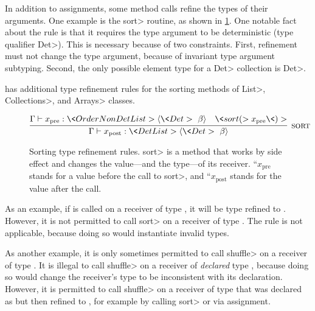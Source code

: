 In addition to assignments, some method calls refine the types of their
arguments.  One example is the \<sort> routine,
as shown in \cref{fig-sorting}.  One notable fact about the 
rule is that it requires the type argument to be deterministic (type
qualifier \<Det>).  This is necessary because of two constraints.
First, refinement must not change the type argument, because of invariant
type argument subtyping.
Second, the only possible element type for a \<Det> collection is \<Det>.


\TheDeterminismChecker has additional type refinement rules for the sorting
methods of \<List>, \<Collections>, and \<Arrays> classes.
\begin{figure}
%     
    
  $\infer[\rulename{sort}]
  {\Gamma \vdash x_{\mathrm{post}} : \<Det List>\angles{\<Det>\ \beta}}
  {\Gamma \vdash x_{\mathrm{pre}} : \<OrderNonDet List>\angles{\<Det>\ \beta} & \<sort(>x_{\mathrm{pre}}\<)>}$
    
%     
    
    \caption{Sorting type refinement rules.  \<sort> is a method that works
      by side effect and changes the value---and the type---of its receiver.
    ``$x_{\mathrm{pre}}$ stands for a value before the call to \<sort>, and
      ``$x_{\mathrm{post}}$ stands for the value after the call.
    }
    \label{fig-sorting}
\end{figure}
As an example, if  is called on a receiver of type
, it will be type refined to
. However, it is not permitted to
call \<sort> on a receiver of type .  The rule is not applicable, because doing so would
instantiate invalid types.


As another example, it is only sometimes permitted to call \<shuffle> on a receiver of
type .  It is illegal to call \<shuffle> on a
receiver of \emph{declared} type , because doing so would change
the receiver's type to be inconsistent with its declaration.  However, it
is permitted to call \<shuffle> on a receiver of type  that was declared as  but then refined to , for example by
calling \<sort> or via assignment.




